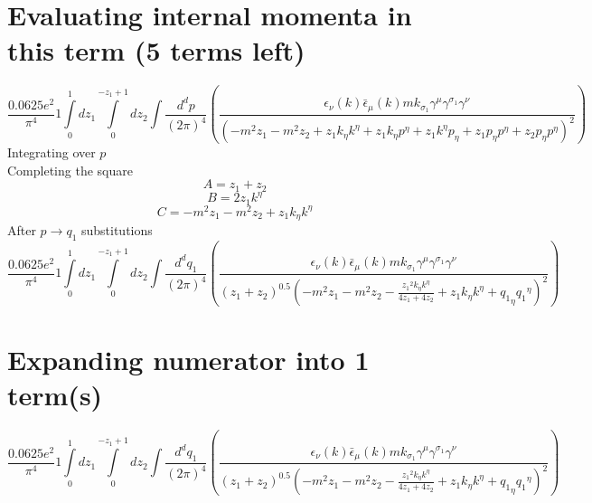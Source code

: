 \section*{Evaluating internal momenta in this term (5 terms left)}
\begin{dmath}\frac{0.0625 e^{2}}{\pi^{4}}1\int\limits_{ 0 }^{ 1 } d{ z_{ 1 } }\int\limits_{ 0 }^{ - { z_{ 1 } } + 1 } d{ z_{ 2 } }\int\frac{d^d p }{ (2\pi)^4 }\left(\frac{\epsilon_{ \nu }({ k }) \bar{\epsilon}_{ \mu }({ k }) m { { k }_{ \sigma_1 } } { \gamma^{ \mu } } { \gamma^{ \sigma_1 } } { \gamma^{ \nu } }}{\left(- m^{2} { z_{ 1 } } - m^{2} { z_{ 2 } } + { z_{ 1 } } { { k }_{ \eta } } { { k }^{ \eta } } + { z_{ 1 } } { { k }_{ \eta } } { { p }^{ \eta } } + { z_{ 1 } } { { k }^{ \eta } } { { p }_{ \eta } } + { z_{ 1 } } { { p }_{ \eta } } { { p }^{ \eta } } + { z_{ 2 } } { { p }_{ \eta } } { { p }^{ \eta } }\right)^{2}}\right)\end{dmath}
Integrating over $p$\\
Completing the square\
\begin{dmath}A = { z_{ 1 } } + { z_{ 2 } }\end{dmath}
\begin{dmath}B = 2 { z_{ 1 } } { { k }^{ \eta } }\end{dmath}
\begin{dmath}C = - m^{2} { z_{ 1 } } - m^{2} { z_{ 2 } } + { z_{ 1 } } { { k }_{ \eta } } { { k }^{ \eta } }\end{dmath}
After $p \to q_1$ substitutions
\begin{dmath}\frac{0.0625 e^{2}}{\pi^{4}}1\int\limits_{ 0 }^{ 1 } d{ z_{ 1 } }\int\limits_{ 0 }^{ - { z_{ 1 } } + 1 } d{ z_{ 2 } }\int\frac{d^d q_1 }{ (2\pi)^4 }\left(\frac{\epsilon_{ \nu }({ k }) \bar{\epsilon}_{ \mu }({ k }) m { { k }_{ \sigma_1 } } { \gamma^{ \mu } } { \gamma^{ \sigma_1 } } { \gamma^{ \nu } }}{\left({ z_{ 1 } } + { z_{ 2 } }\right)^{0.5} \left(- m^{2} { z_{ 1 } } - m^{2} { z_{ 2 } } - \frac{{ z_{ 1 } }^{2} { { k }_{ \eta } } { { k }^{ \eta } }}{4 { z_{ 1 } } + 4 { z_{ 2 } }} + { z_{ 1 } } { { k }_{ \eta } } { { k }^{ \eta } } + { { q_1 }_{ \eta } } { { q_1 }^{ \eta } }\right)^{2}}\right)\end{dmath}
\section*{Expanding numerator into 1 term(s)}
\begin{dmath}\frac{0.0625 e^{2}}{\pi^{4}}1\int\limits_{ 0 }^{ 1 } d{ z_{ 1 } }\int\limits_{ 0 }^{ - { z_{ 1 } } + 1 } d{ z_{ 2 } }\int\frac{d^d q_1 }{ (2\pi)^4 }\left(\frac{\epsilon_{ \nu }({ k }) \bar{\epsilon}_{ \mu }({ k }) m { { k }_{ \sigma_1 } } { \gamma^{ \mu } } { \gamma^{ \sigma_1 } } { \gamma^{ \nu } }}{\left({ z_{ 1 } } + { z_{ 2 } }\right)^{0.5} \left(- m^{2} { z_{ 1 } } - m^{2} { z_{ 2 } } - \frac{{ z_{ 1 } }^{2} { { k }_{ \eta } } { { k }^{ \eta } }}{4 { z_{ 1 } } + 4 { z_{ 2 } }} + { z_{ 1 } } { { k }_{ \eta } } { { k }^{ \eta } } + { { q_1 }_{ \eta } } { { q_1 }^{ \eta } }\right)^{2}}\right)\end{dmath}
